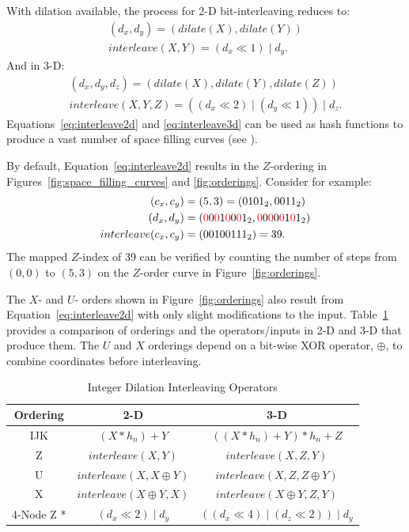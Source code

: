 \documentclass{report}
\begin{document}
With dilation available, the process for 2-D bit-interleaving reduces to:
\begin{align}
(d_x, d_y) = (dilate(X), dilate(Y)) \nonumber \\
interleave(X,Y) = (d_x \ll 1) \mid d_y. 
\label{eq:interleave2d}
\end{align}
And in 3-D: 
\begin{align}
(d_x, d_y, d_z) = (dilate(X), dilate(Y), dilate(Z)) \nonumber \\
interleave(X,Y,Z) = ((d_x \ll 2) \mid (d_y \ll 1)) \mid d_z.
\label{eq:interleave3d}
\end{align}
Equations~\ref{eq:interleave2d} and \ref{eq:interleave3d} can be used as hash functions to produce a vast number of space filling curves (see \cite{Stocco2009}).

By default, Equation~\ref{eq:interleave2d} results in the $Z$-ordering in Figures~\ref{fig:space_filling_curves} and \ref{fig:orderings}. Consider for example:
\begin{align}
(c_x,c_y) & = (5, 3) = (0101_2, 0011_2) \nonumber \\
(d_x,d_y) & =  ({\color{red}0}0{\color{red}0}1{\color{red}0}0{\color{red}0}1_2, {\color{red}0}0{\color{red}0}0{\color{red}0}1{\color{red}0}1_2) \nonumber \\
interleave(c_x, c_y) & = ( 00100111_2 ) = 39. \nonumber
\end{align}
The mapped $Z$-index of 39 can be verified by counting the number of steps from  $(0,0)$ to $(5,3)$ on the $Z$-order curve in Figure~\ref{fig:orderings}. 

The $X$- and $U$- orders shown in Figure~\ref{fig:orderings} also result from Equation~\ref{eq:interleave2d} with only slight modifications to the input. Table~\ref{tbl:orderings} provides a comparison of orderings and the operators/inputs in 2-D and 3-D that produce them. The $U$ and $X$ orderings depend on a bit-wise XOR operator, $\oplus$, to combine coordinates before interleaving. 

\begin{table}
\centering
\caption{Integer Dilation Interleaving Operators}
\label{tbl:orderings}
\begin{tabular}{ c | c | c }
  Ordering & 2-D & 3-D \\
  \hline                        
  IJK & $(X * h_n) + Y$ & $((X * h_n) + Y)*h_n + Z$ \\
  Z & $interleave(X, Y)$ & $interleave(X, Z, Y)$ \\
  U & $interleave(X, X \oplus Y)$ & $interleave(X, Z, Z \oplus Y)$ \\
  X & $interleave(X \oplus Y, X)$ & $interleave(X \oplus Y, Z, Y)$ \\
  4-Node Z * & $(d_x \ll 2) \mid d_y$ & $((d_x \ll 4) \mid (d_z \ll 2)) \mid d_y$ \\
  \hline  
\end{tabular}
\end{table}
\end{document}
